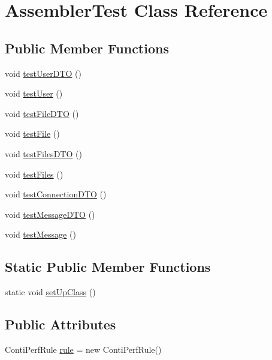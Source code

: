 \hypertarget{class_assembler_test}{}\section{Assembler\+Test Class Reference}
\label{class_assembler_test}
\subsection*{Public Member Functions}
\begin{DoxyCompactItemize}
\item 
void \mbox{\hyperlink{class_assembler_test_a6a1f1330ba102adc9dcb86fa1e3a2666}{test\+User\+D\+TO}} ()
\item 
void \mbox{\hyperlink{class_assembler_test_a367fe0a1d07888aea5c1be783ac5d656}{test\+User}} ()
\item 
void \mbox{\hyperlink{class_assembler_test_a2efc9b1c346055f414a90a83c638b9d2}{test\+File\+D\+TO}} ()
\item 
void \mbox{\hyperlink{class_assembler_test_a096eb74eb050737a255762dd3adff04e}{test\+File}} ()
\item 
void \mbox{\hyperlink{class_assembler_test_a22ab9ea501c253e4bc09ac802edc97d6}{test\+Files\+D\+TO}} ()
\item 
void \mbox{\hyperlink{class_assembler_test_a538ca394aa395f0c635fed95507187c0}{test\+Files}} ()
\item 
void \mbox{\hyperlink{class_assembler_test_a42f3b3fee0099d59ae10ce5adc81c526}{test\+Connection\+D\+TO}} ()
\item 
void \mbox{\hyperlink{class_assembler_test_a317054e0c783d9eaf523e306508c75d8}{test\+Message\+D\+TO}} ()
\item 
void \mbox{\hyperlink{class_assembler_test_afe32ecf0de7758e122ee4138ecaea21d}{test\+Message}} ()
\end{DoxyCompactItemize}
\subsection*{Static Public Member Functions}
\begin{DoxyCompactItemize}
\item 
static void \mbox{\hyperlink{class_assembler_test_ac2b2d56ba73ee546af2431eb90fe5f40}{set\+Up\+Class}} ()
\end{DoxyCompactItemize}
\subsection*{Public Attributes}
\begin{DoxyCompactItemize}
\item 
Conti\+Perf\+Rule \mbox{\hyperlink{class_assembler_test_a79777326d39a2db6f58548231bd2ac1b}{rule}} = new Conti\+Perf\+Rule()
\end{DoxyCompactItemize}


